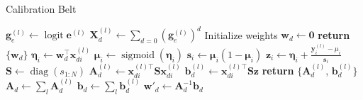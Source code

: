 \documentclass[10pt]{article}
\DeclareMathOperator*{\sigmoid}{sigmoid}
\DeclareMathOperator*{\diag}{diag}
\DeclareMathOperator*{\logit}{logit}
\begin{document}

\begin{algorithm}

  \caption{Calibration Belt}

  \begin{algorithmic}[1] %
                \State $\mathbf{g}_e^{(l)} \gets \logit \mathbf{e}^{(l)}$
                        \State $\mathbf{X}_d^{(l)} 
                        \gets \sum_{d=0} (\mathbf{g}_e^{(l)})^d$
                \EndFor
          \EndProcedure
          \EndFor
                 
                        \State Initialize weights $\mathbf{w}_d \gets \mathbf{0}$
                \EndFor
                \State \textbf{return} $\{\mathbf{w}_d\}$
          \EndProcedure
          \Loop
                          \State $\mathbf{\eta}_i \gets \mathbf{w}_d^{\top} \mathbf{x}_{di}^{(l)}$ 
                          \State $\mathbf{\mu}_i \gets \sigmoid(\mathbf{\eta}_i)$
                          \State $\mathbf{s}_i \gets \mathbf{\mu}_i (1 - \mathbf{\mu}_i)$
                          \State $\mathbf{z}_i \gets \mathbf{\eta}_i 
                                + \frac{\mathbf{y}_i^{(l)} - \mu_i}{\mathbf{s}_i}$
                          \State $\mathbf{S} \gets \diag(s_{1:N})$
                          \State $\mathbf{A}_d^{(l)} 
                                \gets \mathbf{x}_{di}^{(l)\top} \mathbf{S} \mathbf{x}_{di}^{(l)}$
                          \State $\mathbf{b}_d^{(l)} \gets \mathbf{x}_{di}^{(l)\top} \mathbf{S} \mathbf{z}$
                          \State \textbf{return} $\{ \mathbf{A}_d^{(l)}$, $\mathbf{b}_d^{(l)} \}$
                  \EndFor
                  \EndProcedure
                \EndFor
                                  \State $\mathbf{A}_d \gets \sum_l \mathbf{A}_d^{(l)}$
                                  \State $\mathbf{b}_d \gets \sum_l \mathbf{b}_d^{(l)}$
                                  \State $\mathbf{w'}_d \gets \mathbf{A}_d^{-1} \mathbf{b}_d$

\end{algorithmic}
\end{algorithm}
\end{document}
